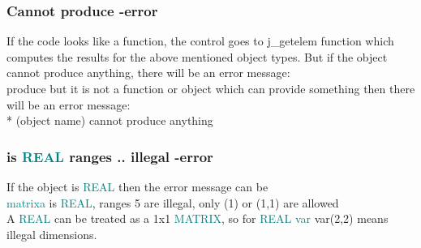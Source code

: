 {\subsubsection{Cannot produce -error} 
\label{isnotfunc} 
If the code looks like a function, the control goes to j\_getelem function 
which computes the results for the above mentioned object types. But if 
the object cannot produce anything, there will be an error message:\\ 
produce   but it is not a function or object which can provide something then 
there will be an error message:\\ 
* (object name) cannot produce anything 
\subsubsection{is \textcolor{teal}{REAL} ranges .. illegal  -error} 
\label{isreal} 
If the object is \textcolor{teal}{REAL} then the error message can be \\ 
\textcolor{teal}{matrixa} is \textcolor{teal}{REAL}, ranges            5  are illegal, only (1) or (1,1) are allowed\\ 
A \textcolor{teal}{REAL} can be treated as a 1x1 \textcolor{teal}{MATRIX}, so for \textcolor{teal}{REAL} \textcolor{teal}{var} \textcolor{VioletRed}{var}(2,2) means illegal dimensions. 
}
